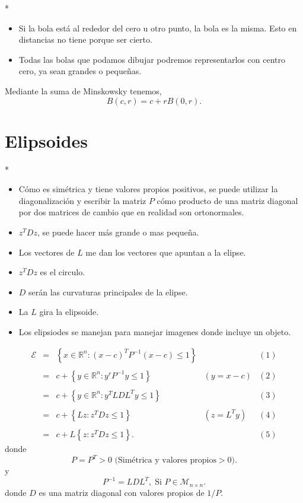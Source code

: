 \begin{paracol}{2}
\switchcolumn[1]*{\noindent\scriptsize
    \begin{itemize}
	\item Si la bola está al rededor del cero u otro punto, la bola es la misma. Esto en distancias no tiene porque ser cierto.
	\item Todas las bolas que podamos dibujar podremos representarlos con centro cero, ya sean grandes o pequeñas.
    \end{itemize}
}
\switchcolumn[0]\noindent
\begin{prop}
    Mediante la suma de Minskowsky tenemos,
    $$B(c,r)=c+rB(0,r).$$
\end{prop}


\section{Elipsoides}

\switchcolumn[1]*{\scriptsize
    \begin{itemize}
	\item Cómo es simétrica y tiene valores propios positivos, se puede utilizar la diagonalización y escribir la matriz $P$ cómo producto de una matriz diagonal por dos matrices de cambio que en realidad son ortonormales.
	\item $z^TDz$, se puede hacer más grande o mas pequeña.
	\item Los vectores de $L$ me dan los vectores que apuntan a la elipse.
	\item $z^TDz$ es el circulo.
	\item $D$ serán las curvaturas principales de la elipse.
	\item La $L$ gira la elipsoide.
	\item Los elipsiodes se manejan para manejar imagenes donde incluye un objeto.
    \end{itemize}
}
\switchcolumn[0]\noindent
$$
\begin{array}{rcllc}
    \mathcal{E}&=&\left\{x\in \mathbb{R}^n : (x-c)^TP^{-1} (x-c)\leq 1\right\}&&(1)\\\\
	       &=& c+\left\{y\in \mathbb{R}^n : y^r P^{-1} y \leq 1\right\} & (y=x-c)&(2)\\\\
	       &=&c+\left\{y\in \mathbb{R}^n : y^T L D L^T y \leq 1\right\}&&(3)\\\\
	       &=&c+\left\{Lz : z^T D z \leq 1\right\} & (z=L^Ty)&(4)\\\\
	       &=& c+L\left\{z:z^TDz\leq 1\right\}. &&(5)
\end{array}
$$
donde 
$$P=P^T>0 \text{ (Simétrica y valores propios}>0).$$
y
$$P^{-1}=LDL^T,\; \text{Si } P\in \mathcal{M}_{n\times n}.$$
donde $D$ es una matriz diagonal con valores propios de $1/P$.


\end{paracol}
